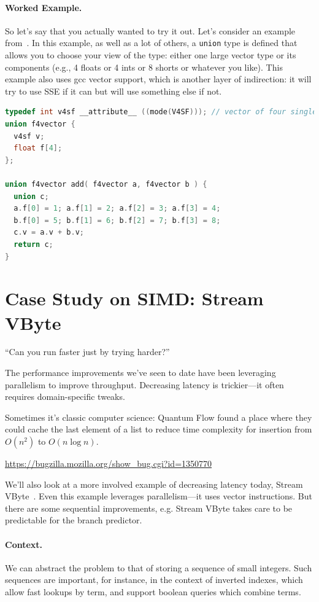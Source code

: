 \documentclass[a4paper]{report}
\begin{document}
\paragraph{Worked Example.} So let's say that you actually wanted to try it out. Let's consider an example from~\cite{simd}. In this example, as well as a lot of others, a \texttt{union} type is defined that allows you to choose your view of the type: either one large vector type or its components (e.g., 4 floats or 4 ints or 8 shorts or whatever you like). This example also uses gcc vector support, which is another layer of indirection: it will try to use SSE if it can but will use something else if not.

\begin{lstlisting}[language=C]
typedef int v4sf __attribute__ ((mode(V4SF))); // vector of four single floats
union f4vector {
  v4sf v;
  float f[4];
};

union f4vector add( f4vector a, f4vector b ) {
  union c;
  a.f[0] = 1; a.f[1] = 2; a.f[2] = 3; a.f[3] = 4;
  b.f[0] = 5; b.f[1] = 6; b.f[2] = 7; b.f[3] = 8;
  c.v = a.v + b.v;
  return c;
}
\end{lstlisting}


\section*{Case Study on SIMD: Stream VByte }

\hfill ``Can you run faster just by trying harder?''

The performance improvements we've seen to date have been leveraging parallelism
to improve throughput. Decreasing latency is trickier---it often requires domain-specific
tweaks.

Sometimes it's classic computer science: Quantum Flow found a place
where they could cache the last element of a list to reduce time
complexity for insertion from $O(n^2)$ to $O(n \log n)$.

\begin{center}
\url{https://bugzilla.mozilla.org/show_bug.cgi?id=1350770}
\end{center}

We'll also look at a more involved example of decreasing latency today, Stream VByte~\cite{LEMIRE20181}.
Even this example leverages parallelism---it uses vector instructions. But there
are some sequential improvements, e.g. Stream VByte takes care to be predictable
for the branch predictor.

\paragraph{Context.} We can abstract the problem to that of storing a sequence of small integers.
Such sequences are important, for instance, in the context of inverted indexes, which allow
fast lookups by term, and support boolean queries which combine terms.
\end{document}

